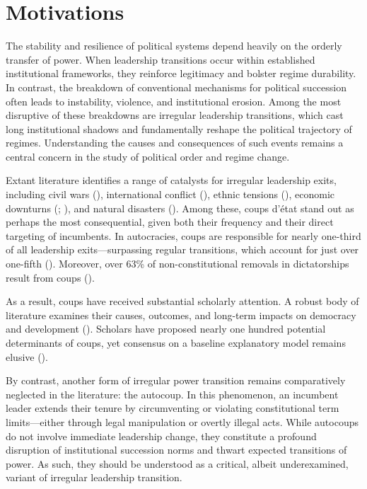 \documentclass[
  12pt,
]{report}
\begin{document}
\section{Motivations}\label{motivations}

The stability and resilience of political systems depend heavily on the
orderly transfer of power. When leadership transitions occur within
established institutional frameworks, they reinforce legitimacy and
bolster regime durability. In contrast, the breakdown of conventional
mechanisms for political succession often leads to instability,
violence, and institutional erosion. Among the most disruptive of these
breakdowns are irregular leadership transitions, which cast long
institutional shadows and fundamentally reshape the political trajectory
of regimes. Understanding the causes and consequences of such events
remains a central concern in the study of political order and regime
change.

Extant literature identifies a range of catalysts for irregular
leadership exits, including civil wars
(), international
conflict (),
ethnic tensions (), economic downturns (; ), and natural
disasters (). Among these, coups d'état stand out as perhaps the most
consequential, given both their frequency and their direct targeting of
incumbents. In autocracies, coups are responsible for nearly one-third
of all leadership exits---surpassing regular transitions, which account
for just over one-fifth (). Moreover, over 63\% of non-constitutional removals in
dictatorships result from coups ().

As a result, coups have received substantial scholarly attention. A
robust body of literature examines their causes, outcomes, and long-term
impacts on democracy and development (). Scholars have proposed nearly one hundred potential
determinants of coups, yet consensus on a baseline explanatory model
remains elusive ().

By contrast, another form of irregular power transition remains
comparatively neglected in the literature: the autocoup. In this
phenomenon, an incumbent leader extends their tenure by circumventing or
violating constitutional term limits---either through legal manipulation
or overtly illegal acts. While autocoups do not involve immediate
leadership change, they constitute a profound disruption of
institutional succession norms and thwart expected transitions of power.
As such, they should be understood as a critical, albeit underexamined,
variant of irregular leadership transition.
\end{document}
